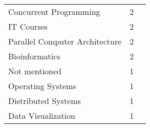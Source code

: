 \begin{table}[ht]
\begin{tabular}{l c p{4cm}}
		Concurrent Programming & 2 \\
		IT Courses & 2 \\
		Parallel Computer Architecture & 2 \\
		Bioinformatics & 2 \\
		Not mentioned & 1 \\
		Operating Systems & 1 \\
		Distributed Systems & 1 \\
		Data Visualization & 1 \\
	\bottomrule
    \end{tabular}
    \label{tab:discipline}
\end{table}